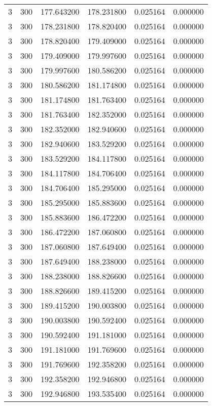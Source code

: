 \begin{longtable}{rrrrrr}
3 & 300 & 177.643200 & 178.231800 & 0.025164 & 0.000000 \\
3 & 300 & 178.231800 & 178.820400 & 0.025164 & 0.000000 \\
3 & 300 & 178.820400 & 179.409000 & 0.025164 & 0.000000 \\
3 & 300 & 179.409000 & 179.997600 & 0.025164 & 0.000000 \\
3 & 300 & 179.997600 & 180.586200 & 0.025164 & 0.000000 \\
3 & 300 & 180.586200 & 181.174800 & 0.025164 & 0.000000 \\
3 & 300 & 181.174800 & 181.763400 & 0.025164 & 0.000000 \\
3 & 300 & 181.763400 & 182.352000 & 0.025164 & 0.000000 \\
3 & 300 & 182.352000 & 182.940600 & 0.025164 & 0.000000 \\
3 & 300 & 182.940600 & 183.529200 & 0.025164 & 0.000000 \\
3 & 300 & 183.529200 & 184.117800 & 0.025164 & 0.000000 \\
3 & 300 & 184.117800 & 184.706400 & 0.025164 & 0.000000 \\
3 & 300 & 184.706400 & 185.295000 & 0.025164 & 0.000000 \\
3 & 300 & 185.295000 & 185.883600 & 0.025164 & 0.000000 \\
3 & 300 & 185.883600 & 186.472200 & 0.025164 & 0.000000 \\
3 & 300 & 186.472200 & 187.060800 & 0.025164 & 0.000000 \\
3 & 300 & 187.060800 & 187.649400 & 0.025164 & 0.000000 \\
3 & 300 & 187.649400 & 188.238000 & 0.025164 & 0.000000 \\
3 & 300 & 188.238000 & 188.826600 & 0.025164 & 0.000000 \\
3 & 300 & 188.826600 & 189.415200 & 0.025164 & 0.000000 \\
3 & 300 & 189.415200 & 190.003800 & 0.025164 & 0.000000 \\
3 & 300 & 190.003800 & 190.592400 & 0.025164 & 0.000000 \\
3 & 300 & 190.592400 & 191.181000 & 0.025164 & 0.000000 \\
3 & 300 & 191.181000 & 191.769600 & 0.025164 & 0.000000 \\
3 & 300 & 191.769600 & 192.358200 & 0.025164 & 0.000000 \\
3 & 300 & 192.358200 & 192.946800 & 0.025164 & 0.000000 \\
3 & 300 & 192.946800 & 193.535400 & 0.025164 & 0.000000 \\

\end{longtable}
